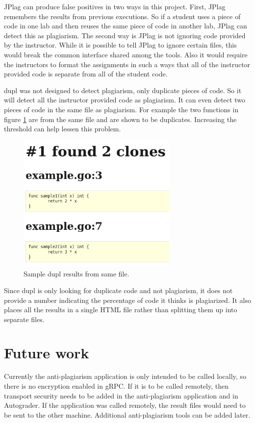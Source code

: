 \documentclass[10pt,journal,compsoc]{IEEEtran}
\begin{document}
	JPlag can produce false positives in two ways in this project. First, JPlag remembers the results from previous executions. So if a student uses a piece of code in one lab and then reuses the same piece of code in another lab, JPlag can detect this as plagiarism. The second way is JPlag is not ignoring code provided by the instructor. While it is possible to tell JPlag to ignore certain files, this would break the common interface shared among the tools. Also it would require the instructors to format the assignments in such a ways that all of the instructor provided code is separate from all of the student code.
	
	dupl was not designed to detect plagiarism, only duplicate pieces of code. So it will detect all the instructor provided code as plagiarism. It can even detect two pieces of code in the same file as plagiarism. For example the two functions in figure \ref{fig:duplSameFile} are from the same file and are shown to be duplicates. Increasing the threshold can help lessen this problem.
	
	\begin{figure}[h!]
		\includegraphics[width=0.7\textwidth]{duplSameFile2.png}
		\caption{Sample dupl results from same file.}
		\label{fig:duplSameFile}
	\end{figure}
	
	Since dupl is only looking for duplicate code and not plagiarism, it does not provide a number indicating the percentage of code it thinks is plagiarized. It also places all the results in a single HTML file rather than splitting them up into separate files.
	
	\section{Future work}
	Currently the anti-plagiarism application is only intended to be called locally, so there is no encryption enabled in gRPC. If it is to be called remotely, then transport security needs to be added in the anti-plagiarism application and in Autograder. If the application was called remotely, the result files would need to be sent to the other machine. Additional anti-plagiarism tools can be added later.
	
\end{document}
